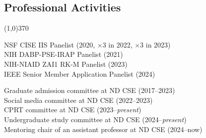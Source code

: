 \documentclass[10pt]{article}
\newenvironment{myindentpar}[1]%
{\begin{list}{}%
         {\setlength{\leftmargin}{#1}}%
         \item[]%
}
{\end{list}}
\newcounter{list}
\begin{document}
\subsection{\sc Professional Activities}
\vspace{-0.4cm} \line(1,0){370} \vspace{-0.1cm}

\begin{myindentpar}{0.75cm}

\hspace{-0.75cm}{\bf Professional Service}

{\small
\textcolor{white}{} NSF CISE IIS Panelist (2020, $\times 3$ in 2022, $\times 3$ in 2023) \\
\textcolor{white}{} NIH DABP-PSE-IRAP Panelist (2021) \\
\textcolor{white}{} NIH-NIAID ZAI1 RK-M Panelist (2023) \\
\textcolor{white}{} IEEE Senior Member Application Panelist (2024)
}

\hspace{-0.75cm}{\bf Departmental Service}

{\small

\textcolor{white}{} Graduate admission committee at ND CSE (2017--2023) \\
\textcolor{white}{} Social media committee at ND CSE (2022--2023) \\
\textcolor{white}{} CPRT committee at ND CSE (2023--\textit{present}) \\
\textcolor{white}{} Undergraduate study committee at ND CSE (2024--\textit{present}) \\
\textcolor{white}{} Mentoring chair of an assistant professor at ND CSE (2024--now)

}

\hspace{-0.75cm}{\bf Ph.D. Dissertation Committee}

{\small

}
\end{myindentpar}
\end{document}
